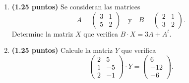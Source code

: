
\begin{enumerate}[label=\alph*)]
\item \textbf{(1.25 puntos)} Se consideran las matrices
\[
A=\begin{pmatrix}3&1\\5&2\end{pmatrix}\quad\text{y}\quad B=\begin{pmatrix}2&1\\3&2\end{pmatrix}.
\]
Determine la matriz $X$ que verifica $B\cdot X=3A+A^t$.
\item \textbf{(1.25 puntos)} Calcule la matriz $Y$ que verifica
\[
\begin{pmatrix}2&5\\1&-5\\2&-1\end{pmatrix}\cdot Y=\begin{pmatrix}6\\-12\\-6\end{pmatrix}.
\]
\end{enumerate}
